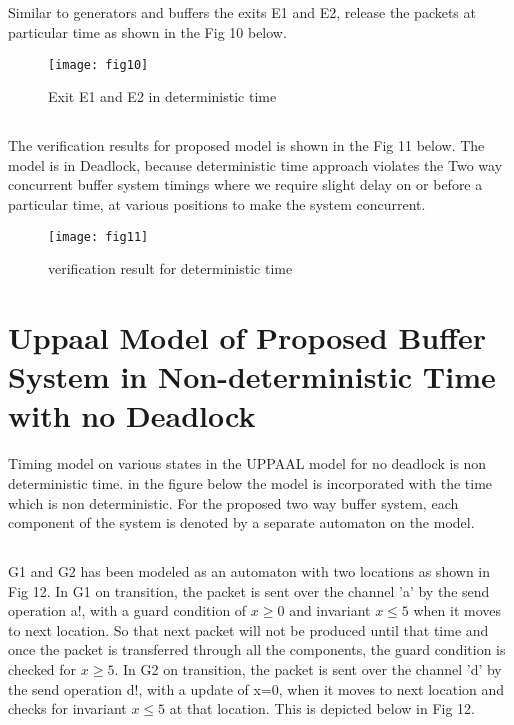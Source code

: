 \documentclass[letterpaper]{article}
\begin{document}
\subsection{} Similar to generators and buffers the exits E1 and E2, release the packets at particular time as shown in the Fig 10 below.
\begin{figure}[bpht!]
\centering
	\texttt{[image: fig10]}
		\caption{Exit E1 and E2 in deterministic time}
	\label{Fig10}
\end{figure}

\subsection{} The verification results for proposed model is shown in the Fig 11 below. The model is in Deadlock, because deterministic time approach violates the Two way concurrent buffer system timings where we require slight delay on or before a particular time, at various positions to make the system concurrent.
\begin{figure}[bpht!]
\centering
	\texttt{[image: fig11]}
		\caption{verification result for deterministic time}
	\label{Fig11}
\end{figure}

\section{Uppaal Model of Proposed Buffer System in Non-deterministic Time with no Deadlock}
\label{10}
Timing model on various states in the UPPAAL model for no deadlock is non deterministic time. in the figure below the model is incorporated with the time which is non deterministic. For the proposed two way buffer system, each component of the system is denoted by a separate automaton on the model.

\subsection{} G1 and G2 has been modeled as an automaton with two locations as shown in Fig 12. In G1 on transition, the packet is sent over the channel 'a' by the send operation a!, with a guard condition of $x \geq 0$ and invariant $x\leq 5$ when it moves to next location. So that next packet will not be produced until that time and once the packet is transferred through all the components, the guard condition is checked for $x\geq 5$. In G2 on transition, the packet is sent over the channel 'd' by the send operation d!, with a update of x=0, when it moves to next location and checks for invariant $x\leq 5$ at that location.  This is depicted below in Fig 12.
\end{document}
